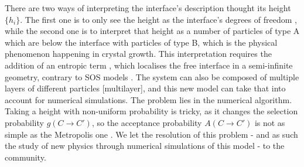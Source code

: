 There are two ways of interpreting the interface's description thought its height $\{h_i\}$. The first one is to only see the height as the interface's degrees of freedom \cite{gilmer_computer_1972,gilmer_simulation_1972}, while the second one is to interpret that height as a number of particles of type A which are below the interface with particles of type B, which is the physical phenomenon happening in crystal growth. This interpretation requires the addition of an entropic term \cite{temperley_statistical_1952}, which localises the free interface in a semi-infinite geometry, contrary to SOS models \cite{chui_pinning_1981}. The system can also be composed of multiple layers of different particles [multilayer], and this new model can take that into account for numerical simulations. 
The problem lies in the numerical algorithm. Taking a height with non-uniform probability is tricky, as it changes the selection probability $g(C\to C')$, so the acceptance probability $A(C\to C')$ is not as simple as the Metropolis one \cite{metropolis_monte_1949,newman_monte_1999}. We let the resolution of this problem - and as such the study of new physics through numerical simulations of this model - to the community. 